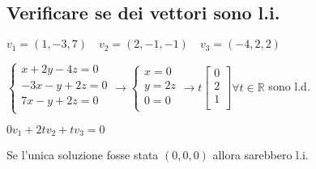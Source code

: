 \subsection{Verificare se dei vettori sono l.i.}
$v_1 = (1, -3, 7) \quad v_2 = (2, -1, -1) \quad v_3 = (-4, 2, 2)$

\(
\begin{cases}
	x + 2y -4z = 0 \\[-0.3em]
	-3x -y +2z = 0 \\[-0.3em]
	7x -y +2z = 0 \\
\end{cases}
\rightarrow
\begin{cases}
	x = 0 \\[-0.3em]
	y = 2z \\[-0.3em]
	0 = 0 \\
\end{cases}
\rightarrow
t\begin{bmatrix}
	0 \\[-0.3em]
	2 \\[-0.3em]
	1 \\
\end{bmatrix} \forall t \in \mathbb{R}
\) sono l.d.

$0v_1 + 2tv_2 + tv_3 = 0$

Se l'unica soluzione fosse stata $(0,0,0)$ allora sarebbero l.i.